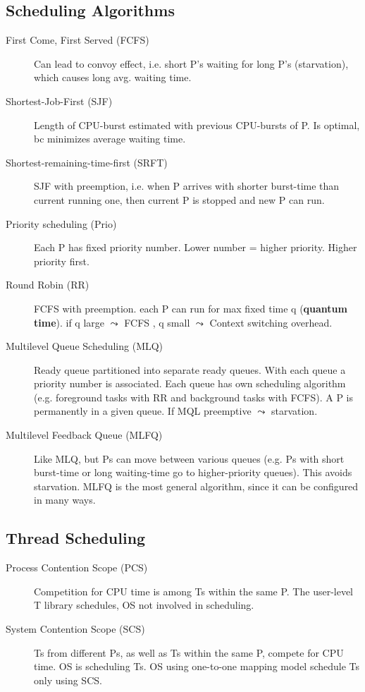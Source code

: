 \subsection*{Scheduling Algorithms}
\begin{description}
  \item[First Come, First Served (FCFS)] Can lead to convoy effect, i.e. short P's waiting for long P's (starvation), which causes long avg. waiting time.
  \item[Shortest-Job-First (SJF)] Length of CPU-burst estimated with previous CPU-bursts of P. Is optimal, bc minimizes average waiting time.
  \item[Shortest-remaining-time-first (SRFT)] SJF with preemption, i.e. when P arrives with shorter burst-time than current running one, then current P is stopped and new P can run.
  \item[Priority scheduling (Prio)] Each P has fixed priority number. Lower number = higher priority. Higher priority first.
  \item[Round Robin (RR)] FCFS with preemption. each P can run for max fixed time q (\textbf{quantum time}). if q large $\leadsto$ FCFS , q small $\leadsto$ Context switching overhead.
  \item[Multilevel Queue Scheduling (MLQ)] Ready queue partitioned into separate ready queues. With each queue a priority number is associated. Each queue has own scheduling algorithm (e.g. foreground tasks with RR and background tasks with FCFS). A P is permanently in a given queue. If MQL preemptive $\leadsto$ starvation.
  \item[Multilevel Feedback Queue (MLFQ)] Like MLQ, but Ps can move between various queues (e.g. Ps with short burst-time or long waiting-time go to higher-priority queues). This avoids starvation. MLFQ is the most general algorithm, since it can be configured in many ways.
\end{description}

\subsection*{Thread Scheduling}
\begin{description}
  \item[Process Contention Scope (PCS)] Competition for CPU time is  among Ts within the same P. The user-level T library schedules, OS not involved in scheduling.
  \item[System Contention Scope (SCS)] Ts from different Ps, as well as Ts within the same P, compete for CPU time. OS is scheduling Ts. OS using one-to-one mapping model schedule Ts only using SCS.
\end{description}

